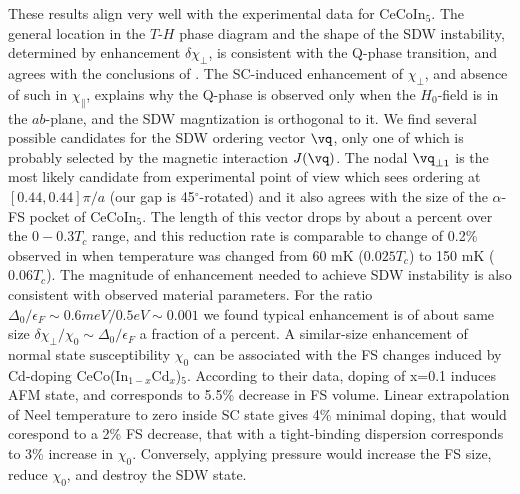 \documentclass[aps,prl,twocolumn,showpacs,amsmath,amssymb]{revtex4-1}
\newcommand{\cecoin}{CeCoIn$_5$}
\begin{document}
These results align very well with the experimental data for \cecoin. 
The general location in the $T$-$H$ phase diagram 
and the shape of the SDW instability, determined by enhancement $\delta \chi_\perp$, 
is consistent with the Q-phase transition, 
and agrees with the conclusions of \cite{kato11_sc_afm}. 
The SC-induced enhancement of $\chi_\perp$, and absence of such in $\chi_\parallel$, explains why the 
Q-phase is observed only when the $H_0$-field is in the $ab$-plane, and the SDW magntization 
is orthogonal to it. 
We find several possible candidates for the SDW ordering vector $\vq$, only one of which 
is probably selected by the magnetic interaction $J(\vq)$. 
The nodal $\vq_{\perp 1}$ is the most likely candidate 
from experimental point of view which sees ordering at $[0.44,0.44]\pi/a$ \cite{Kenzelmann10_Qphase} 
(our gap is 45$^\circ$-rotated) 
and it also agrees with the size of the $\alpha$-FS pocket of \cecoin. \cite{suzuki11_sdw_vortex}
The length of this vector drops by about a percent over the $0 - 0.3 T_c$ range, 
and this reduction rate is comparable to change of 0.2\% 
observed in \cite{Kenzelmann10_Qphase} when temperature 
was changed from 60 mK ($0.025 T_c$) to 150 mK ($0.06 T_c$). 
The magnitude of enhancement needed to achieve SDW instability 
is also consistent with observed material parameters. 
For the ratio 
$\Delta_0/\epsilon_F \sim 0.6 meV/0.5 eV \sim 0.001$ \cite{Allan2013_stm115,Maehira03_fs115} 
we found typical enhancement is of about same size 
$\delta\chi_\perp / \chi_0 \sim \Delta_0/\epsilon_F$  
\ie a fraction of a percent. 
A similar-size enhancement of normal state susceptibility $\chi_0$ can be associated with the FS changes 
induced by Cd-doping CeCo(In$_{1-x}$Cd$_x$)$_5$.\cite{Pham2006_doping115,Hall_2001_FS115,Capan_2010_FS115} 
According to their data, doping of x=0.1 induces AFM state, and corresponds to 5.5\% decrease in FS volume. 
Linear extrapolation of Neel temperature to zero inside SC state gives 4\% minimal doping, 
that would corespond to a 2\% FS decrease, that with a tight-binding dispersion\cite{kato11_sc_afm} 
corresponds to 3\% increase in $\chi_0$. 
Conversely, applying pressure would increase the FS size, reduce $\chi_0$, and destroy the SDW state.\cite{Pham2006_doping115}
\end{document}
